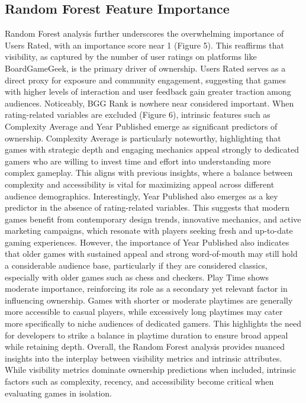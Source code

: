 \documentclass{article}
\begin{document}
\subsection{Random Forest Feature Importance}
Random Forest analysis further underscores the overwhelming importance of Users Rated, with an importance score near 1 (Figure 5). This reaffirms that visibility, as captured by the number of user ratings on platforms like BoardGameGeek, is the primary driver of ownership. Users Rated serves as a direct proxy for exposure and community engagement, suggesting that games with higher levels of interaction and user feedback gain greater traction among audiences. Noticeably, BGG Rank is nowhere near considered important. When rating-related variables are excluded (Figure 6), intrinsic features such as Complexity Average and Year Published emerge as significant predictors of ownership. Complexity Average is particularly noteworthy, highlighting that games with strategic depth and engaging mechanics appeal strongly to dedicated gamers who are willing to invest time and effort into understanding more complex gameplay. This aligns with previous insights, where a balance between complexity and accessibility is vital for maximizing appeal across different audience demographics. Interestingly, Year Published also emerges as a key predictor in the absence of rating-related variables. This suggests that modern games benefit from contemporary design trends, innovative mechanics, and active marketing campaigns, which resonate with players seeking fresh and up-to-date gaming experiences. However, the importance of Year Published also indicates that older games with sustained appeal and strong word-of-mouth may still hold a considerable audience base, particularly if they are considered classics, especially with older games such as chess and checkers. Play Time shows moderate importance, reinforcing its role as a secondary yet relevant factor in influencing ownership. Games with shorter or moderate playtimes are generally more accessible to casual players, while excessively long playtimes may cater more specifically to niche audiences of dedicated gamers. This highlights the need for developers to strike a balance in playtime duration to ensure broad appeal while retaining depth. Overall, the Random Forest analysis provides nuanced insights into the interplay between visibility metrics and intrinsic attributes. While visibility metrics dominate ownership predictions when included, intrinsic factors such as complexity, recency, and accessibility become critical when evaluating games in isolation. 
\end{document}
